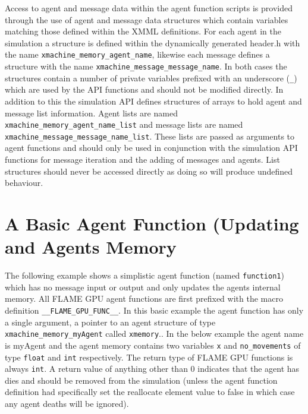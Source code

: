\documentclass[11pt, a4paper, onecolumn, oneside]{report}
\begin{document}
Access to agent and message data within the agent function scripts is provided through the use of agent and message data structures which contain variables matching those defined within the XMML definitions.
For each agent in the simulation a structure is defined within the dynamically generated header.h with the name \texttt{xmachine_memory_agent_name}, likewise each message defines a structure with the name \texttt{xmachine_message_message_name}.
In both cases the structures contain a number of private variables prefixed with an underscore (\texttt{_}) which are used by the API functions and should not be modified directly.
In addition to this the simulation API defines structures of arrays to hold agent and message list information.
Agent lists are named \texttt{xmachine_memory_agent_name_list} and message lists are named \texttt{xmachine_message_message_name_list}.
These lists are passed as arguments to agent functions and should only be used in conjunction with the simulation API functions for message iteration and the adding of messages and agents.
List structures should never be accessed directly as doing so will produce undefined behaviour.

\section{A Basic Agent Function (Updating and Agents Memory}
\label{sec:33}


The following example shows a simplistic agent function (named \texttt{function1}) which has no message input or output and only updates the agents internal memory.
All FLAME GPU agent functions are first prefixed with the macro definition \texttt{__FLAME_GPU_FUNC__}.
In this basic example the agent function has only a single argument, a pointer to an agent structure of type \texttt{xmachine_memory_myAgent} called \texttt{xmemory}..
In the below example the agent name is myAgent and the agent memory contains two variables \texttt{x} and \texttt{no_movements} of type \texttt{float} and \texttt{int} respectively.
The return type of FLAME GPU functions is always \texttt{int}.
A return value of anything other than $0$ indicates that the agent has dies and should be removed from the simulation (unless the agent function definition had specifically set the reallocate element value to false in which case any agent deaths will be ignored).
\end{document}
